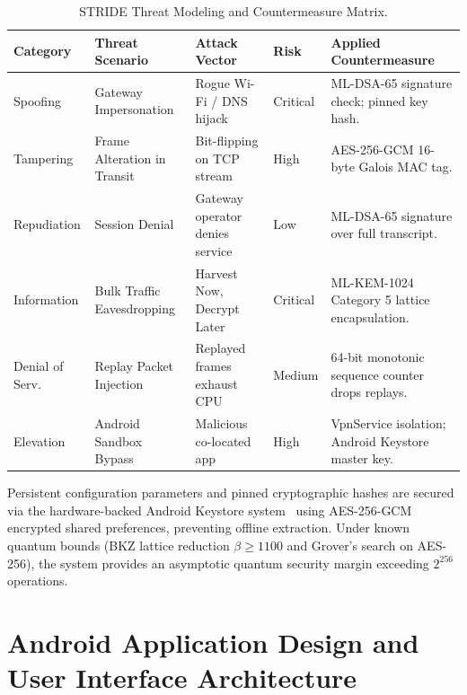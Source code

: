 \begin{table}[htbp]
  \centering
  \scriptsize
  \setlength{\tabcolsep}{3pt}
  \caption{STRIDE Threat Modeling and Countermeasure Matrix.}
  \label{tab:stride_matrix}
  \begin{tabularx}{\linewidth}{@{}p{1.7cm}p{2.8cm}p{2.6cm}p{1.3cm}Y@{}}
    \toprule
    \textbf{Category} & \textbf{Threat Scenario} & \textbf{Attack Vector} & \textbf{Risk} & \textbf{Applied Countermeasure} \\
    \midrule
    Spoofing & Gateway Impersonation & Rogue Wi-Fi / DNS hijack & Critical & ML-DSA-65 signature check; pinned key hash. \\
    Tampering & Frame Alteration in Transit & Bit-flipping on TCP stream & High & AES-256-GCM 16-byte Galois MAC tag. \\
    Repudiation & Session Denial & Gateway operator denies service & Low & ML-DSA-65 signature over full transcript. \\
    Information & Bulk Traffic Eavesdropping & Harvest Now, Decrypt Later & Critical & ML-KEM-1024 Category 5 lattice encapsulation. \\
    Denial of Serv. & Replay Packet Injection & Replayed frames exhaust CPU & Medium & 64-bit monotonic sequence counter drops replays. \\
    Elevation & Android Sandbox Bypass & Malicious co-located app & High & VpnService isolation; Android Keystore master key. \\
    \bottomrule
  \end{tabularx}
\end{table}

Persistent configuration parameters and pinned cryptographic hashes are secured via the hardware-backed Android Keystore system~\cite{android_keystore_docs} using AES-256-GCM encrypted shared preferences, preventing offline extraction. Under known quantum bounds (BKZ lattice reduction $\beta \ge 1100$ and Grover's search on AES-256), the system provides an asymptotic quantum security margin exceeding $2^{256}$ operations.

\section{Android Application Design and User Interface Architecture}
\label{sec:ui_design_philosophy}
\label{sec:screen_specifications}

